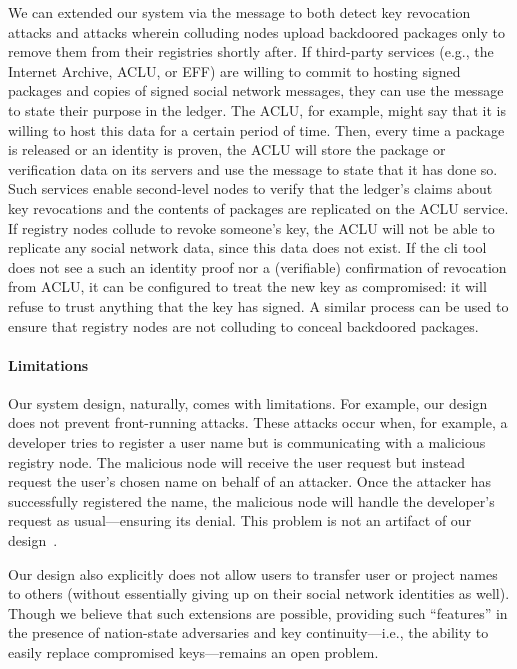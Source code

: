 We can extended our system via the \extensible message to both detect key
revocation attacks and attacks wherein colluding nodes upload backdoored
packages only to remove them from their registries shortly after.
If third-party services (e.g., the Internet Archive, ACLU, or EFF) are willing to commit to hosting signed
packages and copies of signed social network messages, they can use the \extensible message
to state their purpose in the ledger. The ACLU, for example, might say that it is willing
to host this data for a certain period of time. Then, every time a package is
released or an identity is proven, the ACLU will store the package
or verification data on its servers and use the \extensible message to state that it has done
so. Such services enable second-level nodes to verify 
that the ledger's claims about key revocations and the contents of packages are
replicated on the ACLU service. If registry nodes collude to
revoke someone's key, the ACLU will not be able to replicate any
social network data, since this data does not exist. If the \spam{} cli tool does
not see a such an identity proof nor a (verifiable) confirmation of
revocation from ACLU, it can be configured to treat the new key
as compromised: it will refuse to trust anything that the key has signed.
A similar process can be used to ensure that registry nodes are not colluding to
conceal backdoored packages. 

\paragraph{Limitations}
Our system design, naturally, comes with limitations.
%
For example, our design does not prevent front-running attacks. These attacks
occur when, for example, a developer tries to register a user name but
is communicating with a malicious registry node. The malicious node
will receive the user request but instead request the user's chosen name
on behalf of an attacker. 
Once the attacker has successfully registered the name, the malicious node will
handle the developer's request as usual---ensuring its denial.
This problem is not an artifact of our design~\cite{frontrunning}.

Our design also explicitly does not allow users to transfer user or project
names to others (without essentially giving up on their social network identities as well).
%
Though we believe that such extensions are possible, providing such
``features'' in the presence of nation-state adversaries and key
continuity---i.e., the ability to easily replace compromised keys---remains an
open problem.


